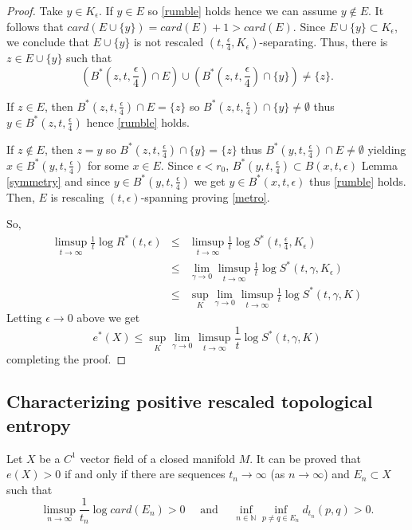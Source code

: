 \documentclass{amsart}
\numberwithin{equation}{section}
\begin{document}
\begin{proof}
Take $y\in K_\epsilon$.
If $y\in E$ so \eqref{rumble} holds hence we can assume
$y\notin E$. It follows that $card(E\cup \{y\})=card(E)+1>card(E)$.
Since $E\cup \{y\}\subset K_\epsilon$,
we conclude that $E\cup \{y\}$ is not rescaled $(t,\frac{\epsilon}4,K_\epsilon)$-separating. Thus, there is $z\in E\cup \{y\}$ such that
$$
(B^*(z,t,\frac{\epsilon}4)\cap E)\cup (B^*(z,t,\frac{\epsilon}4)\cap \{y\})\neq \{z\}.
$$

If $z\in E$, then $B^*(z,t,\frac{\epsilon}4)\cap E=\{z\}$ so $B^*(z,t,\frac{\epsilon}4)\cap \{y\}\neq\emptyset$ thus
$y\in B^*(z,t,\frac{\epsilon}4)$ hence \eqref{rumble} holds.

If $z\notin E$, then $z=y$ so $B^*(z,t,\frac{\epsilon}4)\cap \{y\}=\{z\}$ thus
$B^*(y,t,\frac{\epsilon}4)\cap E\neq\emptyset$ yielding
$x\in B^*(y,t,\frac{\epsilon}4)$ for some $x\in E$.
Since $\epsilon<r_0$, $B^*(y,t,\frac{\epsilon}4)\subset B(x,t,\epsilon)$
Lemma \ref{symmetry} and since $y\in B^*(y,t,\frac{\epsilon}4)$ we get
$y\in B^*(x,t,\epsilon)$  thus \eqref{rumble} holds.
Then, $E$ is rescaling $(t,\epsilon)$-spanning proving \eqref{metro}.

So,
\begin{eqnarray*}
\limsup_{t\to\infty}\frac{1}t\log R^*(t,\epsilon)&\leq& \limsup_{t\to\infty}\frac{1}t\log S^*(t,\frac{\epsilon}4,K_\epsilon)\\
&\leq& \lim_{\gamma\to0}\limsup_{t\to\infty}\frac{1}t\log S^*(t,\gamma,K_\epsilon)\\
&\leq & \sup_K\lim_{\gamma\to0}\limsup_{t\to\infty}\frac{1}t\log S^*(t,\gamma,K)
\end{eqnarray*}
Letting $\epsilon\to0$ above we get
$$
e^*(X)\leq \sup_K\lim_{\gamma\to0}\limsup_{t\to\infty}\frac{1}t\log S^*(t,\gamma,K)
$$
completing the proof.
\end{proof}


\subsection{Characterizing positive rescaled topological entropy}
Let $X$ be a $C^1$ vector field of a closed manifold $M$. It can be proved that $e(X)>0$ if and only if there are sequences
$t_n\to\infty$ (as $n\to\infty$) and $E_n\subset X$ such that
\begin{equation}
\label{esforzo}
\limsup_{n\to\infty}\frac{1}{t_n}\log card(E_n)>0\quad\mbox{ and }
\quad
\inf_{n\in\mathbb{N}}\inf_{p\neq q\in E_n}d_{t_n}(p,q)>0.
\end{equation}
\end{document}
